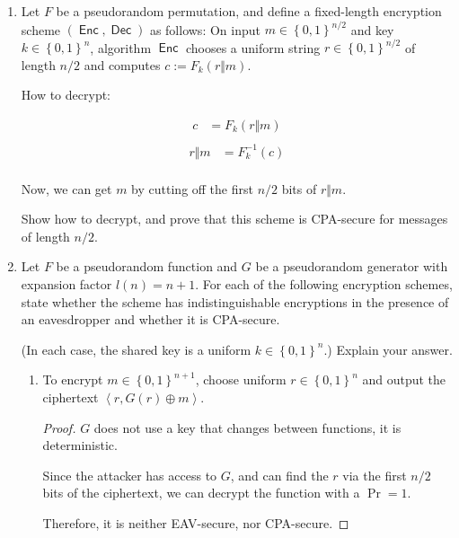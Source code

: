\documentclass{article}
\DeclareMathOperator{\Enc}{\textsf{Enc}}
\DeclareMathOperator{\Dec}{\textsf{Dec}}
\begin{document}
\begin{enumerate}
  \item Let $F$ be a pseudorandom permutation, and define a fixed-length
    encryption scheme $(\Enc, \Dec)$ as follows: On input $m \in
    \left\{0, 1\right\}^{n / 2}$ and key $k \in \left\{0, 1\right\}^n$,
    algorithm $\Enc$ chooses a uniform string $r \in \left\{0,
    1\right\}^{n/2}$ of length $n/2$ and computes $c := F_k(r \Vert m)$.

    How to decrypt:

    \begin{align*}
      c &= F_k(r \Vert m)\\
    \end{align*}
    \begin{align*}
      r \Vert m &= F^{-1}_k(c)\\
    \end{align*}

    Now, we can get $m$ by cutting off the first $n / 2$ bits of $r \Vert m$.

    Show how to decrypt, and prove that this scheme is CPA-secure for
    messages of length $n / 2$.
  \item Let $F$ be a pseudorandom function and $G$ be a pseudorandom generator
    with expansion factor $l(n) = n + 1$. For each of the following encryption
    schemes, state whether the scheme has indistinguishable encryptions in the
    presence of an eavesdropper and whether it is CPA-secure.

    (In each case, the shared key is a uniform $k \in \left\{0, 1\right\}^n$.)
    Explain your answer.


    \begin{enumerate}
      \item To encrypt $m \in \left\{0, 1\right\}^{n + 1}$, choose uniform $r
        \in \left\{0, 1\right\}^n$ and output the ciphertext $\left\langle r,
          G(r) \oplus m\right\rangle$.

          \begin{proof}
            $G$ does not use a key that changes between functions, it is
            deterministic.

            Since the attacker has access to $G$, and can find the $r$ via the
            first $n / 2$ bits of the ciphertext, we can decrypt the function
            with a $\Pr = 1$.

            Therefore, it is neither EAV-secure, nor CPA-secure.
          \end{proof}


\end{enumerate}
\end{enumerate}
\end{document}
